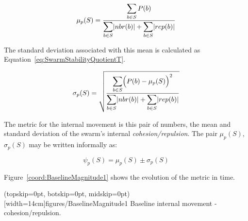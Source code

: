 \documentclass{ieeeaccess}
\begin{document}
\begin{equation}
\label{eq:SwarmStabilityMetricT3}
\mu_p(S) = \frac{\mathlarger{\sum_{b \in S} P(b)}}{\mathlarger{\sum_{b \in S}}|nbr(b)| + \mathlarger{\sum_{b \in S}}|rep(b)|}
\end{equation}


The standard deviation associated with this mean is calculated as
Equation~\ref{eq:SwarmStabilityQuotientT}.


\begin{equation}
\label{eq:SwarmStabilityQuotientT}
\sigma_p(S) = \sqrt{\frac{\mathlarger{\sum_{b \in S}}\Big(P(b)-\mu_p(S)\Big)^2}{\mathlarger{\sum_{b \in S}}|nbr(b)| + \mathlarger{\sum_{b \in S}}|rep(b)|}}
\end{equation}

The metric for the internal movement is this pair of numbers, the mean and
standard deviation of the swarm's internal \textit{cohesion/repulsion}. The
pair $\mu_p(S)$, $\sigma_p(S)$ may be written informally as: 

\begin{equation}
\label{eq:SwarmPotentialMagnitude}
\psi_p(S) = \mu_p(S)\pm \sigma_p(S)
\end{equation}

Figure~\ref{coord:BaselineMagnitude1} shows the evolution of the metric in time.

\Figure[t!](topskip=0pt, botskip=0pt, midskip=0pt)[width=14cm]{figures/BaselineMagnitude1}
{Baseline internal movement - cohesion/repulsion.\label{coord:BaselineMagnitude1}}

\end{document}

